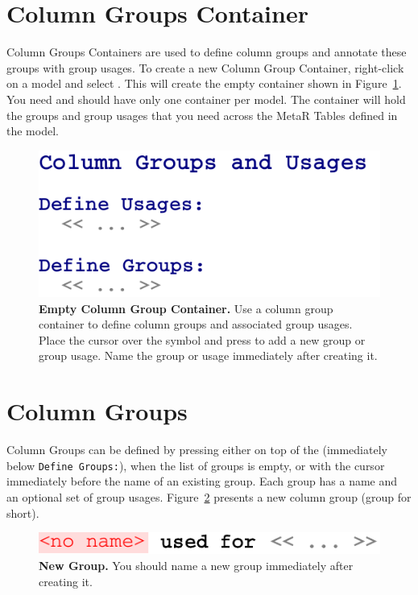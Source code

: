 \section{Column Groups Container}\label{sec:ColumnGroupContainer}
Column Groups Containers are used to define column groups and annotate these groups with group usages.
To create a new Column Group Container, right-click on a model and select . This will create the empty container shown in Figure~\ref{fig:NewColumnGroupContainer}. You need and should have only one container per model. The container will hold the groups and group usages that you need across the MetaR Tables defined in the model.
\begin{figure}
  \centering
  \includegraphics[width=\figWidthNarrow]{figures/NewColumnGroupContainer.pdf}
\caption[Empty Column Group Container.]{\textbf{Empty Column Group Container.} Use a column group container to define column groups and associated group usages. Place the cursor over the \mpsplaceholder{} symbol and press \keys{\return} to add a new group or group usage. Name the group or usage immediately after creating it.}
\label{fig:NewColumnGroupContainer}
\end{figure}

\section{Column Groups}
Column Groups can be defined by pressing \keys{\return} either on top of the \mpsplaceholder{} (immediately below \texttt{Define Groups:}), when the list of groups is empty, or with the cursor immediately before the name of an existing group. Each group has a name and an optional set of group usages. Figure~\ref{fig:NewGroup} presents a new column group (group for short).

\begin{figure}
  \centering
  \includegraphics[width=\figWidthNarrow]{figures/NewGroup.pdf}
\caption[New Group.]{\textbf{New Group.} You should name a new group immediately after creating it.}
\label{fig:NewGroup}
\end{figure}

